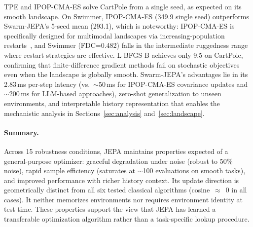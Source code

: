 TPE and IPOP-CMA-ES solve CartPole from a single seed, as expected on
its smooth landscape.
On Swimmer, IPOP-CMA-ES (349.9 single seed) outperforms Swarm-JEPA's
5-seed mean (293.1), which is noteworthy: IPOP-CMA-ES is specifically
designed for multimodal landscapes via increasing-population
restarts~\citep{auger2005restart}, and Swimmer (FDC=0.482) falls in
the intermediate ruggedness range where restart strategies are effective.
L-BFGS-B achieves only 9.5 on CartPole, confirming that finite-difference
gradient methods fail on stochastic objectives even when the landscape
is globally smooth.
Swarm-JEPA's advantages lie in its 2.83\,ms per-step latency
(vs.\ $\sim$50\,ms for IPOP-CMA-ES covariance updates and
$\sim$200\,ms for LLM-based approaches), zero-shot generalization to
unseen environments, and interpretable history representation that
enables the mechanistic analysis in Sections~\ref{sec:analysis}
and~\ref{sec:landscape}.

\paragraph{Summary.}
Across 15 robustness conditions, JEPA maintains properties expected of a
general-purpose optimizer: graceful degradation under noise (robust to
50\% noise), rapid sample efficiency (saturates at $\sim$100 evaluations
on smooth tasks), and improved performance with richer history context.
Its update direction is geometrically distinct from all six tested
classical algorithms (cosine~$\approx$~0 in all cases).
It neither memorizes environments nor requires environment identity at
test time.
These properties support the view that JEPA has learned a transferable
optimization algorithm rather than a task-specific lookup procedure.
